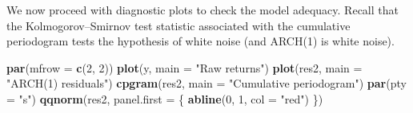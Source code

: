 \documentclass[]{book}
\newenvironment{Shaded}{\begin{snugshade}}{\end{snugshade}}
\newcommand{\KeywordTok}[1]{\textcolor[rgb]{0.13,0.29,0.53}{\textbf{#1}}}
\newcommand{\DataTypeTok}[1]{\textcolor[rgb]{0.13,0.29,0.53}{#1}}
\newcommand{\DecValTok}[1]{\textcolor[rgb]{0.00,0.00,0.81}{#1}}
\newcommand{\StringTok}[1]{\textcolor[rgb]{0.31,0.60,0.02}{#1}}
\newcommand{\ControlFlowTok}[1]{\textcolor[rgb]{0.13,0.29,0.53}{\textbf{#1}}}
\newcommand{\OperatorTok}[1]{\textcolor[rgb]{0.81,0.36,0.00}{\textbf{#1}}}
\newcommand{\NormalTok}[1]{#1}
\begin{document}
\begin{Shaded}
\end{Shaded}

We now proceed with diagnostic plots to check the model adequacy. Recall
that the Kolmogorov--Smirnov test statistic associated with the
cumulative periodogram tests the hypothesis of white noise (and ARCH(1)
is white noise).

\begin{Shaded}
\begin{Highlighting}[]
\KeywordTok{par}\NormalTok{(}\DataTypeTok{mfrow =} \KeywordTok{c}\NormalTok{(}\DecValTok{2}\NormalTok{, }\DecValTok{2}\NormalTok{))}
\KeywordTok{plot}\NormalTok{(y, }\DataTypeTok{main =} \StringTok{"Raw returns"}\NormalTok{)}
\KeywordTok{plot}\NormalTok{(res2, }\DataTypeTok{main =} \StringTok{"ARCH(1) residuals"}\NormalTok{)}
\KeywordTok{cpgram}\NormalTok{(res2, }\DataTypeTok{main =} \StringTok{"Cumulative periodogram"}\NormalTok{)}
\KeywordTok{par}\NormalTok{(}\DataTypeTok{pty =} \StringTok{"s"}\NormalTok{)}
\KeywordTok{qqnorm}\NormalTok{(res2, }\DataTypeTok{panel.first =}\NormalTok{ \{}
    \KeywordTok{abline}\NormalTok{(}\DecValTok{0}\NormalTok{, }\DecValTok{1}\NormalTok{, }\DataTypeTok{col =} \StringTok{"red"}\NormalTok{)}
\NormalTok{\})}
\end{Highlighting}
\end{Shaded}
\end{document}
